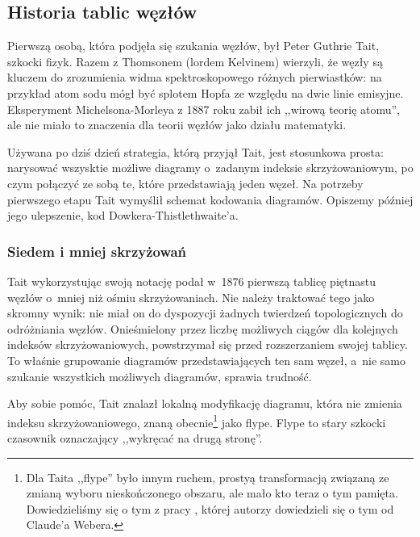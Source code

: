 
\subsection{Historia tablic węzłów}
Pierwszą osobą, która podjęła się szukania węzłów, był Peter Guthrie Tait, szkocki fizyk.
Razem z Thomsonem (lordem Kelvinem) wierzyli, że węzły są kluczem do zrozumienia widma spektroskopowego różnych pierwiastków: na przykład atom sodu mógł być splotem Hopfa ze względu na dwie linie emisyjne.
Eksperyment Michelsona-Morleya z 1887 roku zabił ich ,,wirową teorię atomu'', ale nie miało to znaczenia dla teorii węzłów jako działu matematyki.

Używana po dziś dzień strategia, którą przyjął Tait, jest stosunkowa prosta: narysować wszysktie możliwe diagramy o~zadanym indeksie skrzyżowaniowym, po czym połączyć ze sobą te, które przedstawiają jeden węzeł.
Na potrzeby pierwszego etapu Tait wymyślił schemat kodowania diagramów.
Opiszemy później jego ulepszenie, kod Dowkera-Thistlethwaite'a.

\subsubsection{Siedem i mniej skrzyżowań}
Tait wykorzystując swoją notację podał w~1876 pierwszą tablicę piętnastu węzłów o~mniej niż ośmiu skrzyżowaniach.
Nie należy traktować tego jako skromny wynik: nie miał on do dyspozycji żadnych twierdzeń topologicznych do odróżniania węzłów.
Onieśmielony przez liczbę możliwych ciągów dla kolejnych indeksów skrzyżowaniowych, powstrzymał się przed rozszerzaniem swojej tablicy.
To właśnie grupowanie diagramów przedstawiających ten sam węzeł, a~nie samo szukanie wszystkich możliwych diagramów, sprawia trudność.

Aby sobie pomóc, Tait znalazł lokalną modyfikację diagramu, która nie zmienia indeksu skrzyżowaniowego, znaną obecnie\footnote{Dla Taita ,,flype'' było innym ruchem, prostyą transformacją związaną ze zmianą wyboru nieskończonego obszaru, ale mało kto teraz o tym pamięta. Dowiedzieliśmy się o tym z pracy \cite{menasco93}, której autorzy dowiedzieli się o tym od Claude'a Webera.} jako flype.
Flype to stary szkocki czasownik oznaczający ,,wykręcać na drugą stronę''.

